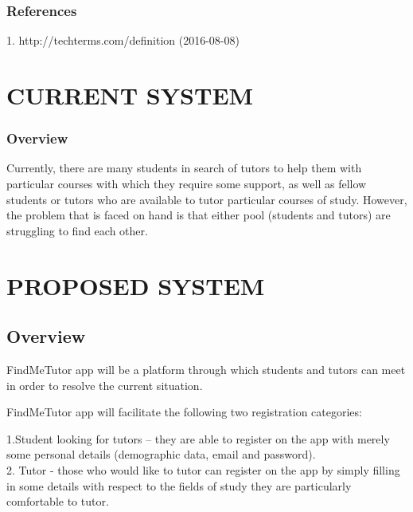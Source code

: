 \documentclass[12pt]{article}
\begin{document}
\subsubsection{References}
1. http://techterms.com/definition (2016-08-08)

\section{CURRENT SYSTEM}
\subsubsection{Overview}
\begin{flushleft}
Currently, there are many students in search of tutors to help them with particular courses with which they require some support, as well as fellow students or tutors who are available to tutor particular courses of study. However, the problem that is faced on hand is that either pool (students and tutors) are struggling to find each other. 
\end{flushleft}

\section{PROPOSED SYSTEM}
\subsection{Overview}
\begin{flushleft}
FindMeTutor app will be a platform through which students and tutors can meet in order to resolve the current situation. 
\end{flushleft}
\begin{flushleft}
FindMeTutor app will facilitate the following two registration categories: 

\begin{flushleft}
1.Student looking for tutors – they are able to register on the app with merely some personal details (demographic data, email and password).\\
2. Tutor - those who would like to tutor can register on the app by simply filling in some details with respect to the fields of study they are particularly comfortable to tutor.\\
\end{flushleft}
\end{flushleft}
\end{document}

